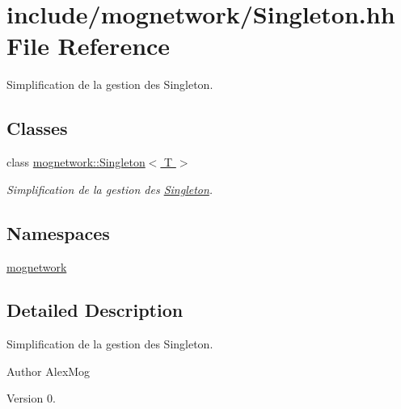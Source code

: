 \hypertarget{_singleton_8hh}{\section{include/mognetwork/\-Singleton.hh File Reference}
\label{_singleton_8hh}
}


Simplification de la gestion des Singleton.  


\subsection*{Classes}
\begin{DoxyCompactItemize}
\item 
class \hyperlink{classmognetwork_1_1_singleton}{mognetwork\-::\-Singleton$<$ T $>$}
\begin{DoxyCompactList}\small\item\em Simplification de la gestion des \hyperlink{classmognetwork_1_1_singleton}{Singleton}. \end{DoxyCompactList}\end{DoxyCompactItemize}
\subsection*{Namespaces}
\begin{DoxyCompactItemize}
\item 
\hyperlink{namespacemognetwork}{mognetwork}
\end{DoxyCompactItemize}


\subsection{Detailed Description}
Simplification de la gestion des Singleton. \begin{DoxyAuthor}{Author}
Alex\-Mog 
\end{DoxyAuthor}
\begin{DoxyVersion}{Version}
0. 
\end{DoxyVersion}
